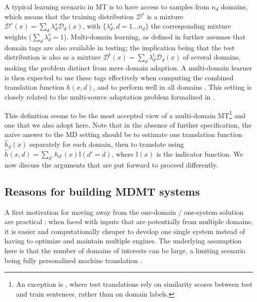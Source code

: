 \documentclass[11pt,a4paper]{article}
\newcommand{\fyTodo}[1]{\Todo[FY:]{\textcolor{orange}{#1}}}
\newcommand{\revision}[1]{#1}
\newcommand{\indic}[1]{\ensuremath{\mathbb{I}(#1)}}
\begin{document}
A typical learning scenario in MT is to have access to samples from $n_d$ domains, which means that the training distribution $\mathcal{D}^s$ is a mixture $\mathcal{D}^s(x) = \sum_d \lambda^{s}_{d} \mathcal{D}_d(x)$\revision{, with $\{\lambda^{s}_d, d=1 \dots n_d\}$ the corresponding mixture weights ($\sum_d \lambda^{s}_d=1$)}. Multi-domain learning, as defined in \cite{Dredze08online} further assumes that domain tags are also available in testing; the implication being that the test distribution is also as a mixture $\mathcal{D}^t(x) = \sum_d \lambda^{t}_{d} \mathcal{D}_d(x)$ of several domains, making the problem distinct from mere domain adaption. A multi-domain learner is then expected to use these tags effectively \cite{Joshi12multidomain} when computing the combined translation function $h(x,d)$, and to perform well in all domains \cite{Finkel09hierarchical}. This setting is closely related to the multi-source adaptation problem formalized in \cite{Mansour09domainadaptation,Mansour09multiple,Hoffman18algorithms}.

This definition seems to be the most accepted view of a multi-domain MT\footnote{An exception is \citep{Farajian17multidomain}, where test translations rely on similarity scores between test and train sentences, rather than on domain labels.} and one that we also adopt here. Note that in the absence of further specification, the naive answer to the MD setting should be to estimate one translation function $\hat{h}_d(x)$ separately for each domain, then to translate using $\hat{h}(x,d) = \sum_{d'} h_{d'}(x) \indic{d' = d}$, where $\indic{x}$ is the indicator function. We now discuss the arguments that are put forward to proceed differently.


\subsection{Reasons for building MDMT systems \label{ssec:whymdmt}}

A first motivation for moving away from the one-domain / one-system solution are practical  \cite{Sennrich13multidomain,Farajian17neural}: when faced with inputs that are potentially from multiple domains, it is easier and computationally cheaper to develop one single system instead of having to optimize and maintain multiple engines. The underlying assumption here is that the number of domains of interests can be large, a limiting scenario being fully personalized machine translation \cite{Michel2018extreme}.
\end{document}
